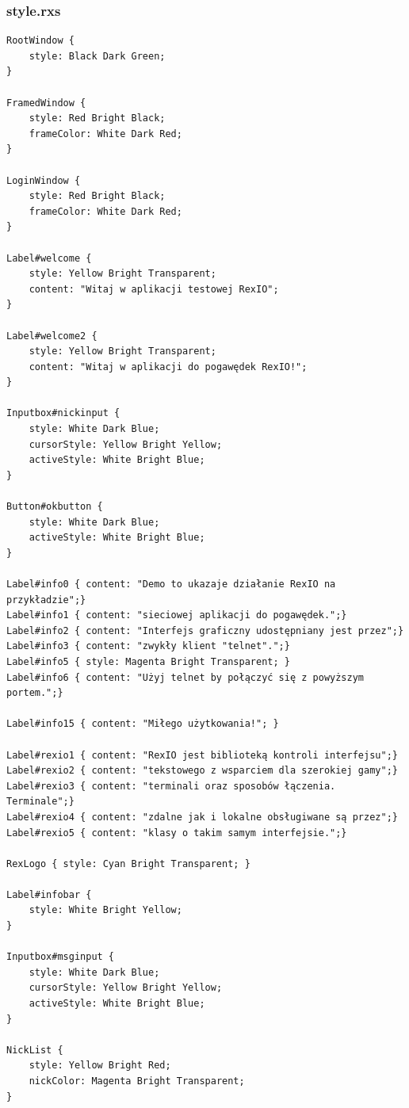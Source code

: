 \subsubsection{style.rxs}
\begin{verbatim}
RootWindow {
    style: Black Dark Green;
}

FramedWindow {
    style: Red Bright Black;
    frameColor: White Dark Red;
}

LoginWindow {
    style: Red Bright Black;
    frameColor: White Dark Red;
}

Label#welcome {
    style: Yellow Bright Transparent;
    content: "Witaj w aplikacji testowej RexIO";
}

Label#welcome2 {
    style: Yellow Bright Transparent;
    content: "Witaj w aplikacji do pogawędek RexIO!";
}

Inputbox#nickinput {
    style: White Dark Blue;
    cursorStyle: Yellow Bright Yellow;
    activeStyle: White Bright Blue;
}

Button#okbutton {
    style: White Dark Blue;
    activeStyle: White Bright Blue;
}

Label#info0 { content: "Demo to ukazaje działanie RexIO na przykładzie";}
Label#info1 { content: "sieciowej aplikacji do pogawędek.";}
Label#info2 { content: "Interfejs graficzny udostępniany jest przez";}
Label#info3 { content: "zwykły klient "telnet".";}
Label#info5 { style: Magenta Bright Transparent; }
Label#info6 { content: "Użyj telnet by połączyć się z powyższym portem.";}

Label#info15 { content: "Miłego użytkowania!"; }

Label#rexio1 { content: "RexIO jest biblioteką kontroli interfejsu";}
Label#rexio2 { content: "tekstowego z wsparciem dla szerokiej gamy";}
Label#rexio3 { content: "terminali oraz sposobów łączenia. Terminale";}
Label#rexio4 { content: "zdalne jak i lokalne obsługiwane są przez";}
Label#rexio5 { content: "klasy o takim samym interfejsie.";}

RexLogo { style: Cyan Bright Transparent; }

Label#infobar {
    style: White Bright Yellow;
}

Inputbox#msginput {
    style: White Dark Blue;
    cursorStyle: Yellow Bright Yellow;
    activeStyle: White Bright Blue;
}

NickList {
    style: Yellow Bright Red;
    nickColor: Magenta Bright Transparent;
}
\end{verbatim}



